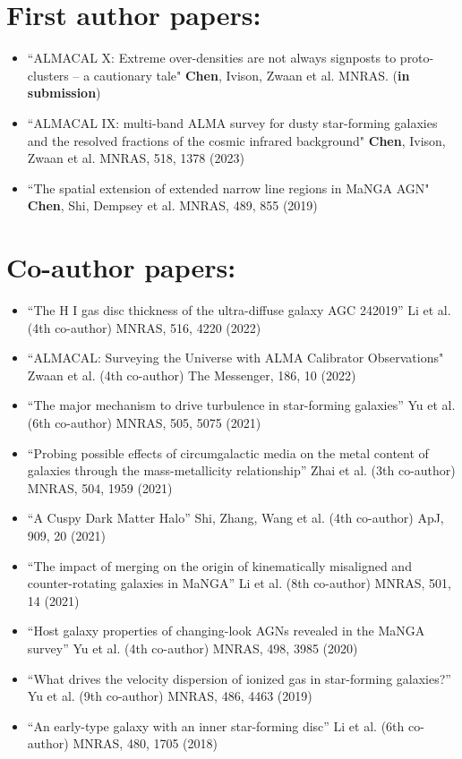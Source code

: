 \documentclass[A4,11pt]{article}
\newenvironment{paperlist}
{ \begin{itemize}[leftmargin=0.8cm, label={$\bullet$}]
    \setlength{\itemsep}{1pt}
    \setlength{\parskip}{1pt}
    \setlength{\parsep}{1pt}     }
{ \end{itemize}                  }
\begin{document}
\section{First author papers:}
\begin{paperlist}
    \item ``ALMACAL X: Extreme over-densities are not always signposts to proto-clusters -- a cautionary tale" {\bf Chen}, Ivison, Zwaan et al. MNRAS. ({\bf in submission})
    \item ``ALMACAL IX: multi-band ALMA survey for dusty star-forming galaxies and the resolved fractions of the cosmic infrared background" {\bf Chen}, Ivison, Zwaan et al. MNRAS, 518, 1378 (2023)
    \item ``The spatial extension of extended narrow line regions in MaNGA AGN" {\bf Chen}, Shi, Dempsey et al. MNRAS, 489, 855 (2019)
\end{paperlist}


\section{Co-author papers:}
\begin{paperlist}
    \item ``The H I gas disc thickness of the ultra-diffuse galaxy AGC 242019” Li et al. (4th co-author) MNRAS, 516, 4220 (2022)
    \item ``ALMACAL: Surveying the Universe with ALMA Calibrator Observations" Zwaan et al. (4th co-author) The Messenger, 186, 10 (2022)
    \item ``The major mechanism to drive turbulence in star-forming galaxies” Yu et al. (6th co-author) MNRAS, 505, 5075 (2021)
    \item ``Probing possible effects of circumgalactic media on the metal content of galaxies through the mass-metallicity relationship” Zhai et al. (3th co-author) MNRAS, 504, 1959 (2021)
    \item ``A Cuspy Dark Matter Halo” Shi, Zhang, Wang et al. (4th co-author) ApJ, 909, 20 (2021)
    \item ``The impact of merging on the origin of kinematically misaligned and counter-rotating galaxies in MaNGA” Li et al. (8th co-author) MNRAS, 501, 14 (2021)
    \item ``Host galaxy properties of changing-look AGNs revealed in the MaNGA survey” Yu et al. (4th co-author) MNRAS, 498, 3985 (2020)
    \item ``What drives the velocity dispersion of ionized gas in star-forming galaxies?” Yu et al. (9th co-author) MNRAS, 486, 4463 (2019)
    \item ``An early-type galaxy with an inner star-forming disc” Li et al. (6th co-author) MNRAS, 480, 1705 (2018)
\end{paperlist}
\end{document}
